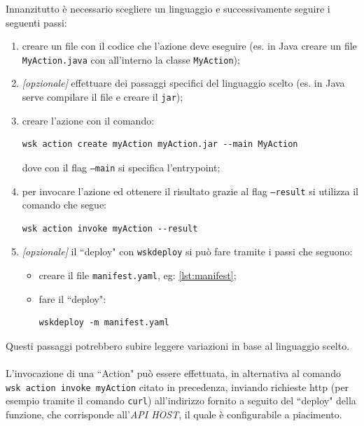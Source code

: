 \documentclass[12pt,a4paper,openany,twoside]{book}
\begin{document}
Innanzitutto è necessario scegliere un linguaggio e successivamente seguire i seguenti passi:
\begin{enumerate}
    \item creare un file con il codice che l'azione deve eseguire (es. in Java creare un file \texttt{MyAction.java} con all'interno la classe \texttt{MyAction});
    
    \item \textit{[opzionale]} effettuare dei passaggi specifici del linguaggio scelto (es. in Java serve compilare il file e creare il \texttt{jar});
    
    \item creare l'azione con il comando:\begin{lstlisting}
wsk action create myAction myAction.jar --main MyAction\end{lstlisting}
    dove con il flag \texttt{--main} si specifica l'entrypoint;
    
    \item per invocare l'azione ed ottenere il risultato grazie al flag \texttt{--result} si utilizza il comando che segue:\begin{lstlisting}
wsk action invoke myAction --result\end{lstlisting}
    
    \item \textit{[opzionale]} il ``deploy" con \texttt{wskdeploy} si può fare tramite i passi che seguono:
        \begin{itemize}
            \item creare il file \texttt{manifest.yaml}, eg: \cref{lst:manifest}; 
            
            
            
            \item fare il ``deploy":\begin{lstlisting}
wskdeploy -m manifest.yaml\end{lstlisting}
        \end{itemize}
\end{enumerate}
Questi passaggi potrebbero subire leggere variazioni in base al linguaggio scelto.
\\ \\
L'invocazione di una ``Action" può essere effettuata, in alternativa al comando \texttt{wsk action invoke myAction} citato in precedenza, inviando richieste \ac{http} (per esempio tramite il comando \texttt{curl}) all'indirizzo fornito a seguito del ``deploy" della funzione, che corrisponde all'\textit{API HOST}, il quale è configurabile a piacimento.
\end{document}
